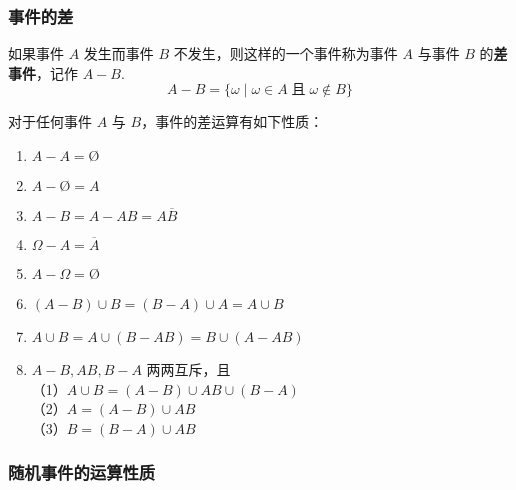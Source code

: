 \subsubsection{事件的差}

如果事件 $A$ 发生而事件 $B$ 不发生，则这样的一个事件称为事件 $A$ 与事件 $B$ 的\textbf{差事件}，记作 $A-B$.
$$
A - B = \{ \omega \mid \omega \in A \;\text{且}\; \omega \notin B \}
$$

\begin{property}
    \indent 对于任何事件 $A$ 与 $B$，事件的差运算有如下性质：
    \begin{enumerate}
        \item $A - A = \text{\O}$
        \item $A - \text{\O} = A$
        \item $A - B = A - AB = A \overline{B}$
        \item $\varOmega - A = \overline{A}$
        \item $A - \varOmega = \text{\O}$
        \item $(A-B) \cup B = (B-A) \cup A = A \cup B$
        \item $A \cup B = A \cup (B-AB) = B \cup (A-AB)$
        \item $A-B,AB,B-A$ 两两互斥，且 \\
        （1）$A \cup B = (A-B) \cup AB \cup (B-A)$\\
        （2）$A = (A-B) \cup AB$\\
        （3）$B = (B-A) \cup AB$
    \end{enumerate}
\end{property}

\subsubsection{随机事件的运算性质}

